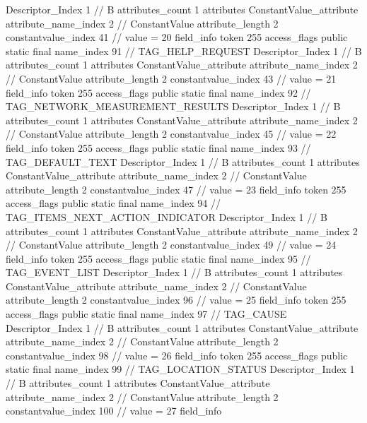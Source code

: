 {{{{{				Descriptor_Index	1		// B
				attributes_count	1
				attributes {
				ConstantValue_attribute {
					attribute_name_index	2		// ConstantValue
					attribute_length	2
					constantvalue_index	41		// value = 20
				}
				}
			}
			field_info {
				token	255
				access_flags	public static final
				name_index	91		// TAG_HELP_REQUEST
				Descriptor_Index	1		// B
				attributes_count	1
				attributes {
				ConstantValue_attribute {
					attribute_name_index	2		// ConstantValue
					attribute_length	2
					constantvalue_index	43		// value = 21
				}
				}
			}
			field_info {
				token	255
				access_flags	public static final
				name_index	92		// TAG_NETWORK_MEASUREMENT_RESULTS
				Descriptor_Index	1		// B
				attributes_count	1
				attributes {
				ConstantValue_attribute {
					attribute_name_index	2		// ConstantValue
					attribute_length	2
					constantvalue_index	45		// value = 22
				}
				}
			}
			field_info {
				token	255
				access_flags	public static final
				name_index	93		// TAG_DEFAULT_TEXT
				Descriptor_Index	1		// B
				attributes_count	1
				attributes {
				ConstantValue_attribute {
					attribute_name_index	2		// ConstantValue
					attribute_length	2
					constantvalue_index	47		// value = 23
				}
				}
			}
			field_info {
				token	255
				access_flags	public static final
				name_index	94		// TAG_ITEMS_NEXT_ACTION_INDICATOR
				Descriptor_Index	1		// B
				attributes_count	1
				attributes {
				ConstantValue_attribute {
					attribute_name_index	2		// ConstantValue
					attribute_length	2
					constantvalue_index	49		// value = 24
				}
				}
			}
			field_info {
				token	255
				access_flags	public static final
				name_index	95		// TAG_EVENT_LIST
				Descriptor_Index	1		// B
				attributes_count	1
				attributes {
				ConstantValue_attribute {
					attribute_name_index	2		// ConstantValue
					attribute_length	2
					constantvalue_index	96		// value = 25
				}
				}
			}
			field_info {
				token	255
				access_flags	public static final
				name_index	97		// TAG_CAUSE
				Descriptor_Index	1		// B
				attributes_count	1
				attributes {
				ConstantValue_attribute {
					attribute_name_index	2		// ConstantValue
					attribute_length	2
					constantvalue_index	98		// value = 26
				}
				}
			}
			field_info {
				token	255
				access_flags	public static final
				name_index	99		// TAG_LOCATION_STATUS
				Descriptor_Index	1		// B
				attributes_count	1
				attributes {
				ConstantValue_attribute {
					attribute_name_index	2		// ConstantValue
					attribute_length	2
					constantvalue_index	100		// value = 27
				}
				}
			}
			field_info {
}}}}}
